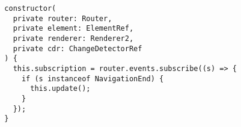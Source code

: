 \begin{verbatim}
  constructor(
    private router: Router,
    private element: ElementRef,
    private renderer: Renderer2,
    private cdr: ChangeDetectorRef
  ) {
    this.subscription = router.events.subscribe((s) => {
      if (s instanceof NavigationEnd) {
        this.update();
      }
    });
  }
\end{verbatim}
